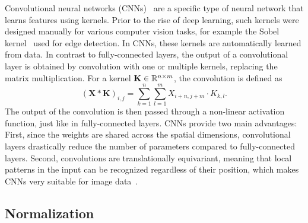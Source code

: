 Convolutional neural networks (CNNs)~\cite{CNN} are a specific type of neural network that learns features using kernels.
Prior to the rise of deep learning, such kernels were designed manually for various computer vision tasks, for example the Sobel kernel~\cite{Sobel} used for edge detection.
In CNNs, these kernels are automatically learned from data. In contrast to fully-connected layers, the output of a convolutional layer is obtained by convolution with one or multiple kernels, replacing the matrix multiplication.
For a kernel $\mathbf{K} \in \mathbb{R}^{n \times m}$, the convolution is defined as
\begin{equation}
    (\mathbf{X} \ast \mathbf{K})_{i,j} = \sum_{k=1}^{n}\sum_{l=1}^{m} X_{i+n,j+m} \cdot K_{k,l}.
\end{equation}
The output of the convolution is then passed through a non-linear activation function, just like in fully-connected layers.
CNNs provide two main advantages: First, since the weights are shared across the spatial dimensions, convolutional layers drastically reduce the number of parameters compared to fully-connected layers. 
Second, convolutions are translationally equivariant, meaning that local patterns in the input can be recognized regardless of their position, which makes CNNs very suitable for image data~\cite{DeepLearning}.

\subsection{Normalization}

